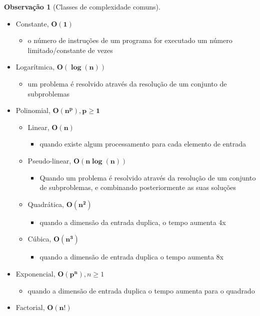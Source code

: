 \documentclass[a4paper, 12pt]{article}
\newtheorem{remark}{Observação}
\begin{document}
\begin{remark}[Classes de complexidade comuns]\end{remark}
    \begin{itemize}
        \item Constante, $\mathbf{O(1)}$
        \begin{itemize}
            \item o número de instruções de um programa for executado um número limitado/constante de vezes            
        \end{itemize}
        \item Logarítmica, $\mathbf{O(\log(n))}$
        \begin{itemize}
            \item um problema é resolvido através da resolução de um conjunto de subproblemas
        \end{itemize}
        \item Polinomial, $\mathbf{O(n^p), p \geq 1}$
        \begin{itemize}
            \item Linear, $\mathbf{O(n)}$
            \begin{itemize}
                \item quando existe algum processamento para cada elemento de entrada
            \end{itemize}
            \item Pseudo-linear, $\mathbf{O(n\log(n))}$
            \begin{itemize}
                \item Quando um problema é resolvido através da resolução de um conjunto de subproblemas, e combinando posteriormente as suas soluções
            \end{itemize}
            \item Quadrática, $\mathbf{O(n^2)}$
            \begin{itemize}
                \item quando a dimensão da entrada duplica, o tempo aumenta 4x
            \end{itemize}
            \item Cúbica, $\mathbf{O(n^3)}$
            \begin{itemize}
                \item quando a dimensão de entrada duplica o tempo aumenta 8x
            \end{itemize}
        \end{itemize}
        \item Exponencial, $\mathbf{O(p^n)}, n \geq 1$
        \begin{itemize}
            \item quando a dimensão de entrada duplica o tempo aumenta para o quadrado
        \end{itemize}
        \item Factorial, $\mathbf{O(n!)}$
    \end{itemize}
\end{document}

